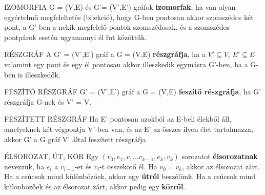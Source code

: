 \begin{definicio}{IZOMORFIA}
G = (V,E) és G'= (V',E') gráfok \textbf{izomorfak}, ha van olyan egyértelmű megfeleltetés (bijekció), hogy G-ben pontosan akkor szomszédos két pont, a G'-ben a nekik megfelelő pontok szomszédosak, és a szomszédos pontpárok esetén ugyanannyi él fut közöttük.
\end{definicio}

\begin{definicio}{RÉSZGRÁF}
A G' = (V',E') gráf a G = (V,E) \textbf{részgráfja}, ha a $V' \subseteq V$, $E' \subseteq E$ valamint egy pont és egy él pontosan akkor illeszkedik egymásra G'-ben, ha a G-ben is illeszkedők.
\end{definicio}

\begin{definicio}{FESZÍTŐ RÉSZGRÁF}
G' = (V',E') gráf a G = (V,E)\textbf{ feszítő részgráfja}, ha G' részgráfja G-nek és V' = V.
\end{definicio}

\begin{definicio}{FESZÍTETT RÉSZGRÁF}
Ha E' pontosan azokból az E-beli élekből áll, amelyeknek két végpontja V'-ben van, és az E' az összes ilyen élet tartalmazza, akkor G' a G gráf V' által feszített részgráfja.
\end{definicio}

\begin{definicio}{ÉLSOROZAT, ÚT, KÖR}
Egy $(v_0, e_1, v_1 ... v_{k-1}, e_k, v_k)$ sorozatot \textbf{élsorozatnak} nevezzük, ha $e_i$ a $v_{i-1}$-et és $v_i$-t összekötő él. Ha $v_0 = v_k$, akkor az élsorozat zárt. Ha a csúcsok mind különbözőek, akkor egy \textbf{útról} beszélünk. Ha a csúcsok mind különbözőek és az élsorozat zárt, akkor pedig egy \textbf{körről}.
\end{definicio}



